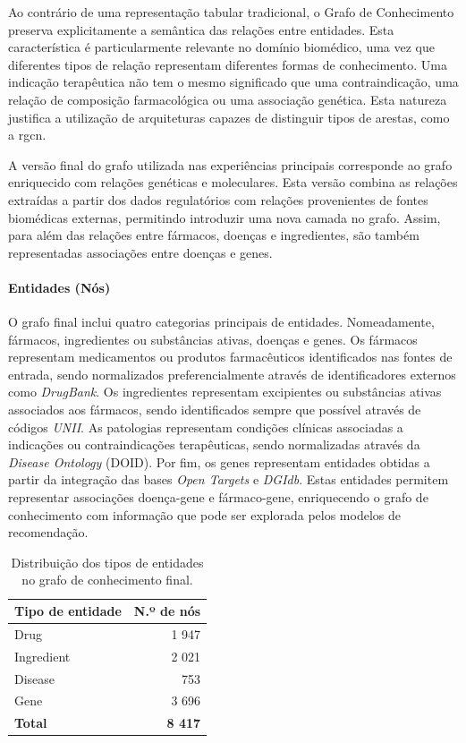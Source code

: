 Ao contrário de uma representação tabular tradicional, o Grafo de Conhecimento preserva explicitamente a semântica das relações entre entidades. Esta característica é particularmente relevante no domínio biomédico, uma vez que diferentes tipos de relação representam diferentes formas de conhecimento. Uma indicação terapêutica não tem o mesmo significado que uma contraindicação, uma relação de composição farmacológica ou uma associação genética. Esta natureza justifica a utilização de arquiteturas capazes de distinguir tipos de arestas, como a \acrshort{rgcn}.

A versão final do grafo utilizada nas experiências principais corresponde ao grafo enriquecido com relações genéticas e moleculares. Esta versão combina as relações extraídas a partir dos dados regulatórios com relações provenientes de fontes biomédicas externas, permitindo introduzir uma nova camada no grafo. Assim, para além das relações entre fármacos, doenças e ingredientes, são também representadas associações entre doenças e genes.

\paragraph{Entidades (Nós)}
O grafo final inclui quatro categorias principais de entidades. Nomeadamente, fármacos, ingredientes ou substâncias ativas, doenças e genes. Os fármacos representam medicamentos ou produtos farmacêuticos identificados nas fontes de entrada, sendo normalizados preferencialmente através de identificadores externos como \emph{DrugBank}. Os ingredientes representam excipientes ou substâncias ativas associados aos fármacos, sendo identificados sempre que possível através de códigos \emph{UNII}. As patologias representam condições clínicas associadas a indicações ou contraindicações terapêuticas, sendo normalizadas através da \emph{Disease Ontology} (DOID). Por fim, os genes representam entidades obtidas a partir da integração das bases \emph{Open Targets} e \emph{DGIdb}. Estas entidades permitem representar associações doença-gene e fármaco-gene, enriquecendo o grafo de conhecimento com informação que pode ser explorada pelos modelos de recomendação.

\begin{table}[H]
\centering
\caption{Distribuição dos tipos de entidades no grafo de conhecimento final.}
\label{tab:stats_entidades}
\begin{tabular}{|l|r|}
\hline
\rowcolor[HTML]{EFEFEF}
\textbf{Tipo de entidade} & \textbf{N.º de nós} \\ \hline
Drug & 1 947 \\ \hline
Ingredient & 2 021 \\ \hline
Disease & 753 \\ \hline
Gene & 3 696 \\ \hline
\hline
\textbf{Total} & \textbf{8 417} \\ \hline
\end{tabular}
\end{table}


